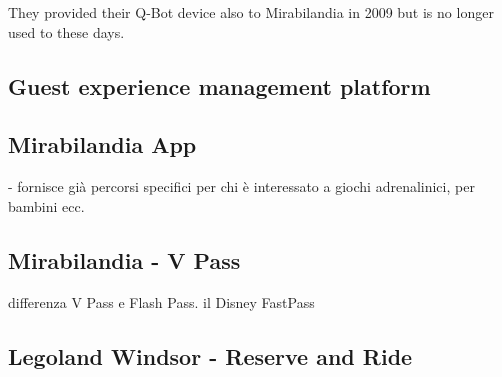 They provided their Q-Bot device also to Mirabilandia in 2009 but is no longer used to these days.

\subsection{Guest experience management platform}\label{subsec:guest-experience-management-platform}

\subsection{Mirabilandia App}\label{subsec:mirabilandia-app}
- fornisce già percorsi specifici per chi è interessato a giochi adrenalinici, per bambini ecc.

\subsection{Mirabilandia - V Pass}\label{subsec:mirabilandia-v-pass}
differenza V Pass e Flash Pass.
il Disney FastPass

\subsection{Legoland Windsor - Reserve and Ride}\label{subsec:legoland-windsor---reserve-and-ride}

